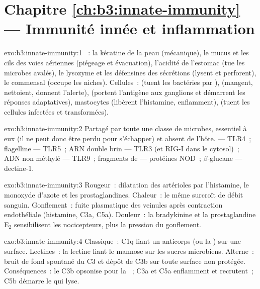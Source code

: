 \section*{Chapitre \ref{ch:b3:innate-immunity} --- Immunité innée et inflammation}

\begin{solution}{exo:b3:innate-immunity:1}
~: la kératine de la peau (mécanique), le mucus et les cils des
voies aériennes (piégeage et évacuation), l'acidité de l'estomac (tue
les microbes avalés), le lysozyme et les défensines des sécrétions
(lysent et perforent), le  commensal (occupe les niches).
Cellules~:  (tuent les bactéries par ),
 (mangent, nettoient, donnent l'alerte),  (portent l'antigène aux ganglions et démarrent les réponses
adaptatives), mastocytes (libèrent l'histamine, enflamment),  (tuent les cellules infectées et transformées).
\end{solution}

\begin{solution}{exo:b3:innate-immunity:2}
Partagé par toute une classe de microbes, essentiel à eux (il ne peut
donc être perdu pour s'échapper) et absent de l'hôte. 
--- TLR4~; flagelline --- TLR5~; ARN double brin --- TLR3 (et RIG-I dans
le cytosol)~; ADN  non méthylé --- TLR9~; fragments de 
--- protéines NOD~; $\beta$-glucane --- dectine-1.
\end{solution}

\begin{solution}{exo:b3:innate-immunity:3}
Rougeur~: dilatation des artérioles par l'histamine, le monoxyde d'azote
et les prostaglandines. Chaleur~: le même surcroît de débit sanguin.
Gonflement~: fuite plasmatique des veinules après contraction
endothéliale (histamine, C3a, C5a). Douleur~: la bradykinine et la
prostaglandine E$_{2}$ sensibilisent les nocicepteurs, plus la pression
du gonflement.
\end{solution}

\begin{solution}{exo:b3:innate-immunity:4}
Classique~: C1q liant un anticorps (ou la ) sur une
surface. Lectines~: la lectine liant le mannose sur les sucres
microbiens. Alterne~: bruit de fond spontané du C3 et dépôt de C3b sur
toute surface non protégée. Conséquences~: le C3b opsonise pour la
~; C3a et C5a enflamment et recrutent~; C5b démarre le
 qui lyse.
\end{solution}

